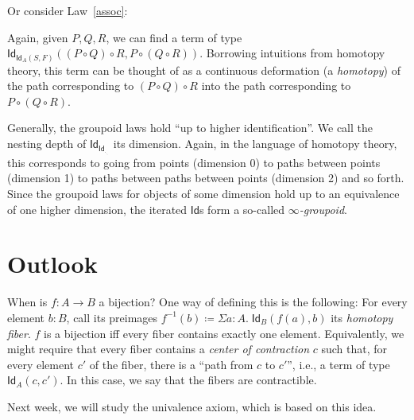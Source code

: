 \documentclass{article} \usepackage{chtt-notes} \usepackage{stmaryrd}
\begin{document}
Or consider Law~\ref{assoc}:
\begin{center}\end{center}
Again, given $P, Q, R$, we can find a term of type $\textsf{Id}_{\textsf{Id}_A(S, F)}((P \circ Q) \circ R, P \circ (Q \circ R))$.
Borrowing intuitions from homotopy theory, this term can be thought of as a continuous deformation (a \emph{homotopy}) of the path corresponding to $(P \circ Q) \circ R$ into the path corresponding to $P \circ (Q \circ R)$.

Generally, the groupoid laws hold ``up to higher identification''.
We call the nesting depth of $\textsf{Id}_{\textsf{Id}_{._{._{.}}}}$ its dimension.
Again, in the language of homotopy theory, this corresponds to going from points (dimension 0) to paths between points (dimension 1) to paths between paths between points (dimension 2) and so forth.
Since the groupoid laws for objects of some dimension hold up to an equivalence of one higher dimension, the iterated $\textsf{Id}$s form a so-called \emph{$\infty$-groupoid}.

\section{Outlook}
When is $f : A \to B$ a bijection?
One way of defining this is the following:
For every element $b : B$, call its preimages $f^{-1}(b) \coloneqq \Sigma a: A. \; \textsf{Id}_{B}(f(a), b)$ its \emph{homotopy fiber}.
$f$ is a bijection iff every fiber contains exactly one element.
Equivalently, we might require that every fiber contains a \emph{center of contraction} $c$ such that, for every element $c'$ of the fiber, there is a ``path from $c$ to $c'$'', i.e., a term of type $\textsf{Id}_A(c, c')$.
In this case, we say that the fibers are contractible.

Next week, we will study the univalence axiom, which is based on this idea.

 
\end{document}
